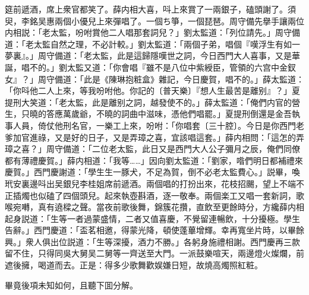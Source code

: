 筵前遞酒，席上衆官都笑了。薛内相大喜，呌上來賞了一兩銀子，磕頭謝了。須臾，李銘吴惠兩個小優兒上來彈唱了。一個ち箏，一個琵琶。周守備先擧手讓兩位内相説：「老太監，吩咐賞他二人唱那套詞兒？」劉太監道：「列位請先。」周守備道：「老太監自然之理，不必計較。」劉太監道：「兩個子弟，唱個『嘆浮生有如一夢裏』。」周守備道：「老太監，此是這歸隱嘆世之詞，今日西門大人喜事，又是華誕，唱不的。」劉太監又道：「你會唱『雖不是八位中紫綬臣，管領的六宫中金釵女』？」周守備道：「此是《陳琳抱粧盒》雜記，今日慶賀，唱不的。」薛太監道：「你呌他二人上來，等我吩咐他。你記的〔普天樂〕『想人生最苦是離别』？」夏提刑大笑道：「老太監，此是離别之詞，越發使不的。」薛太監道：「俺們内官的營生，只曉的答應萬歲爺，不曉的詞曲中滋味，憑他們唱罷。」夏提刑倒還是金吾執事人員，倚仗他刑名官，一樂工上來，吩咐：「你唱套〔三十腔〕。今日是你西門老爹加官進祿，又是好的日子，又是弄璋之喜，宜該唱這套。」薛内相問：「這怎的弄璋之喜？」周守備道：「二位老太監，此日又是西門大人公子彌月之辰，俺們同僚都有薄禮慶賀。」薛内相道：「我等……」因向劉太監道：「劉家，喒們明日都補禮來慶賀。」西門慶謝道：「學生生一豚犬，不足為賀，倒不必老太監費心。」説畢，喚玳安裏邊呌出吴銀兒李桂姐席前遞酒。兩個唱的打扮出來，花枝招颺，望上不端不正插燭也似磕了四個頭兒。起來執壺斟酒，逐一敬奉。兩個楽工又唱一套新詞，歌喉宛囀，真有遶樑之聲。當夜前歌後舞，錦簇花攢，直飲至更餘時分，方纔薛内相起身説道：「生等一者過蒙盛情，二者又值喜慶，不覺留連暢飲，十分擾極。學生告辭。」西門慶道：「盃茗相邀，得蒙光降，頓使蓬蓽增輝。幸再寬坐片時，以畢餘興。」衆人俱出位説道：「生等深擾，酒力不勝。」各躬身施禮相謝。西門慶再三款留不住，只得同吳大舅吴二舅等一齊送至大門。一派鼓樂喧天，兩邊燈火燦爛，前遮後擁，喝道而去。正是：得多少歌舞歡娱嫌日短，故燒高燭照紅粧。

畢竟後項未知如何，且聽下囬分解。

